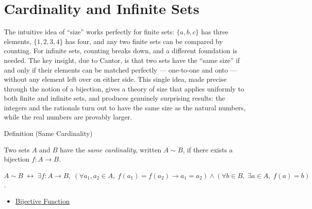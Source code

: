 
\section{Cardinality and Infinite Sets}


\begin{exposition}
The intuitive idea of ``size'' works perfectly for finite sets: $\{a,b,c\}$
has three elements, $\{1,2,3,4\}$ has four, and any two finite sets can be
compared by counting. For infinite sets, counting breaks down, and a
different foundation is needed. The key insight, due to Cantor, is that two
sets have the ``same size'' if and only if their elements can be matched
perfectly --- one-to-one and onto --- without any element left over on either
side. This single idea, made precise through the notion of a bijection, gives
a theory of size that applies uniformly to both finite and infinite sets, and
produces genuinely surprising results: the integers and the rationals turn out
to have the same size as the natural numbers, while the real numbers are
provably larger.
\end{exposition}


\begin{definitionbox}{Definition (Same Cardinality)}
\begin{definition}\label{def:same-cardinality}
Two sets $A$ and $B$ have the \emph{same cardinality}, written $A \sim B$,
if there exists a bijection $f : A \to B$.
\end{definition}
\end{definitionbox}

\begin{remark*}
$A \sim B \;\leftrightarrow\; \exists f: A\to B,\; (\forall a_1,a_2\in A,\; f(a_1)=f(a_2)\to a_1=a_2) \wedge (\forall b\in B,\; \exists a\in A,\; f(a)=b)$.
\end{remark*}


\begin{dependencies}
\begin{itemize}
  \item \hyperref[def:bijective]{Bijective Function}
\end{itemize}
\end{dependencies}

